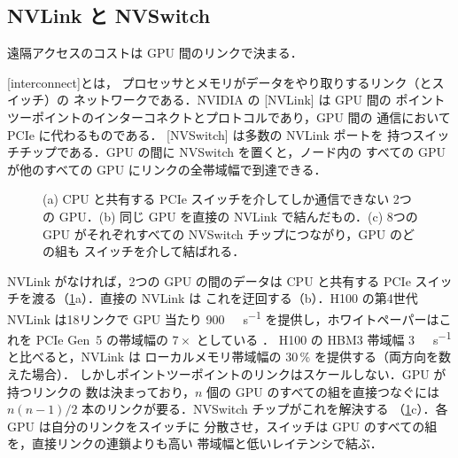 \documentclass[../main.tex]{subfiles}
\begin{document}
\subsection{NVLink と NVSwitch}

遠隔アクセスのコストは GPU 間のリンクで決まる．

\begin{definition}
  [interconnect]とは，
  プロセッサとメモリがデータをやり取りするリンク（とスイッチ）の
  ネットワークである．NVIDIA の
  [NVLink] は GPU 間の
  ポイントツーポイントのインターコネクトとプロトコルであり，GPU 間の
  通信において PCIe に代わるものである．
  [NVSwitch] は多数の NVLink ポートを
  持つスイッチチップである．GPU の間に NVSwitch を置くと，ノード内の
  すべての GPU が他のすべての GPU にリンクの全帯域幅で到達できる．
\end{definition}


\begin{figure}[tb]
  \centering
  
  \caption{(a) CPU と共有する PCIe スイッチを介してしか通信できない
    2つの GPU．(b) 同じ GPU を直接の NVLink で結んだもの．(c) 8つの
    GPU がそれぞれすべての NVSwitch チップにつながり，GPU のどの組も
    スイッチを介して結ばれる．}
  \label{fig:l09-interconnect}
\end{figure}

NVLink がなければ，2つの GPU の間のデータは CPU と共有する PCIe
スイッチを渡る（\cref{fig:l09-interconnect}a）．直接の NVLink は
これを迂回する（b）．H100 の第4世代 NVLink は18リンクで GPU 当たり
\SI{900}{\giga\byte\per\second} を提供し，ホワイトペーパーはこれを
PCIe Gen~5 の帯域幅の $7\times$ としている \cite{nvidia2022hopper}．
H100 の HBM3 帯域幅 \SI{3}{\tera\byte\per\second} と比べると，NVLink は
ローカルメモリ帯域幅の 30\,\% を提供する（両方向を数えた場合）．
しかしポイントツーポイントのリンクはスケールしない．GPU が持つリンクの
数は決まっており，$n$ 個の GPU のすべての組を直接つなぐには
$n(n-1)/2$ 本のリンクが要る．NVSwitch チップがこれを解決する
（\cref{fig:l09-interconnect}c）．各 GPU は自分のリンクをスイッチに
分散させ，スイッチは GPU のすべての組を，直接リンクの連鎖よりも高い
帯域幅と低いレイテンシで結ぶ．
\end{document}
